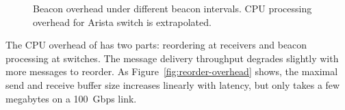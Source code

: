 
\begin{figure}[t]
	\centering
	\hspace{0.01\textwidth}
	\caption{}
\end{figure}


\begin{figure}[t]
	\centering
	\hspace{0.01\textwidth}
	\caption{
		Beacon overhead under different beacon intervals.
		CPU processing overhead for Arista switch is extrapolated.
	}
	\label{fig:overhead}
\end{figure}


The CPU overhead of \sys has two parts: reordering at receivers and beacon processing at switches.
The message delivery throughput degrades slightly with more messages to reorder.
As Figure~\ref{fig:reorder-overhead} shows, the maximal send and receive buffer size increases linearly with latency, but only takes a few megabytes on a 100~Gbps link.


